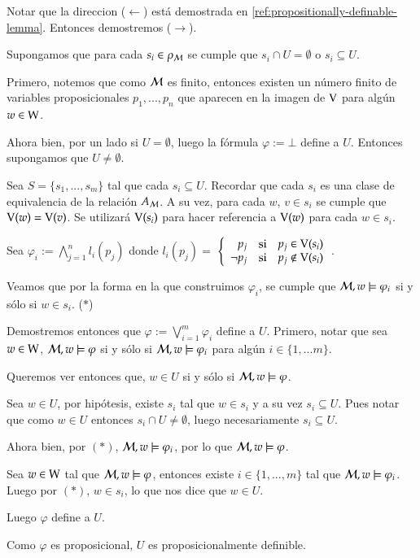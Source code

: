 \begin{demostracion}
    Notar que la direccion ($\leftarrow$) está demostrada en \ref{ref:propositionally-definable-lemma}. Entonces demostremos ($\rightarrow$).

    Supongamos que para cada $s_i \in \rho_{\mathcal{M}}$ se cumple que $s_i \cap U = \emptyset$ o $s_i \subseteq U$.

    Primero, notemos que como $\mathcal{M}$ es finito, entonces existen un número finito de variables proposicionales $p_1,...,p_n$ que aparecen en la imagen de $\mathrm{V}$ para algún $w \in \mathrm{W}$.

    Ahora bien, por un lado si $U = \emptyset$, luego la fórmula $ \varphi := \bot$ define a $U$. Entonces supongamos que $U \neq \emptyset$. 
    
    Sea $S = \{s_1,...,s_m\}$ tal que cada $s_i \subseteq U$. Recordar que cada $s_i$ es una clase de equivalencia de la relación $A_{\mathcal{M}}$. A su vez, para cada $w$, $v \in s_i$ se cumple que $\mathrm{V}(w) = \mathrm{V}(v)$. Se utilizará $\mathrm{V}(s_i)$ para hacer referencia a $\mathrm{V}(w)$ para cada $w \in s_i$.

    Sea $\varphi_i := \bigwedge\limits_{j = 1}^{n} l_i(p_j)$ donde $l_i(p_j) = $
    $\left\{ \begin{array}{rcl}
            p_j & \mbox{si}
            & p_j \in \mathrm{V}(s_i) \\ \neg p_j & \mbox{si} & p_j \notin \mathrm{V}(s_i) \\
            \end{array}\right. 
    $.

    Veamos que por la forma en la que construimos $\varphi_i$, se cumple que $\mathcal{M}, w \models \varphi_i$ si y sólo si $w \in s_i$. ($*$)
    
    Demostremos entonces que $\varphi := \bigvee\limits_{i = 1}^{m}\varphi_i$ define a $U$. Primero, notar que sea $w \in \mathrm{W}$, $\mathcal{M}, w \models \varphi$ si y sólo si $\mathcal{M}, w \models \varphi_i$ para algún $i \in \{1,...m\}$.  

    Queremos ver entonces que, $w \in U$ si y sólo si $\mathcal{M}, w \models \varphi$. 

    Sea $w \in U$, por hipótesis, existe $s_i$ tal que $w \in s_i$ y a su vez $s_i \subseteq U$. Pues notar que como $w \in U$ entonces $s_i \cap U \neq \emptyset$, luego necesariamente $s_i \subseteq U$.
    
    Ahora bien, por $(*)$, $\mathcal{M}, w \models \varphi_i$, por lo que $\mathcal{M}, w \models \varphi$.

    Sea $w \in \mathrm{W}$ tal que $\mathcal{M}, w \models \varphi$, entonces existe $i \in \{1,...,m\}$ tal que $\mathcal{M}, w \models \varphi_i$. Luego por $(*)$, $w \in s_i$, lo que nos dice que $w \in U$.

    Luego $\varphi$ define a $U$.
    
    Como $\varphi$ es proposicional, $U$ es proposicionalmente definible.
\end{demostracion}

